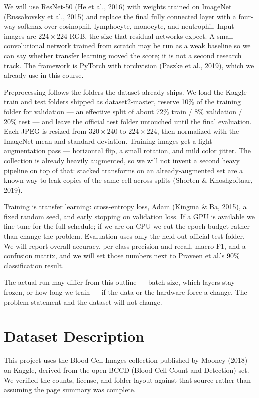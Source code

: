 \documentclass[11pt]{article}
\begin{document}
We will use ResNet-50 (He et al., 2016) with weights trained on ImageNet (Russakovsky et al., 2015) and replace the final fully connected layer with a four-way softmax over eosinophil, lymphocyte, monocyte, and neutrophil. Input images are $224\times 224$ RGB, the size that residual networks expect. A small convolutional network trained from scratch may be run as a weak baseline so we can say whether transfer learning moved the score; it is not a second research track. The framework is PyTorch with torchvision (Paszke et al., 2019), which we already use in this course.

Preprocessing follows the folders the dataset already ships. We load the Kaggle train and test folders shipped as dataset2-master, reserve 10\% of the training folder for validation --- an effective split of about 72\% train / 8\% validation / 20\% test --- and leave the official test folder untouched until the final evaluation. Each JPEG is resized from $320\times 240$ to $224\times 224$, then normalized with the ImageNet mean and standard deviation. Training images get a light augmentation pass --- horizontal flip, a small rotation, and mild color jitter. The collection is already heavily augmented, so we will not invent a second heavy pipeline on top of that: stacked transforms on an already-augmented set are a known way to leak copies of the same cell across splits (Shorten \& Khoshgoftaar, 2019).

Training is transfer learning: cross-entropy loss, Adam (Kingma \& Ba, 2015), a fixed random seed, and early stopping on validation loss. If a GPU is available we fine-tune for the full schedule; if we are on CPU we cut the epoch budget rather than change the problem. Evaluation uses only the held-out official test folder. We will report overall accuracy, per-class precision and recall, macro-F1, and a confusion matrix, and we will set those numbers next to Praveen et al.'s 90\% classification result.

The actual run may differ from this outline --- batch size, which layers stay frozen, or how long we train --- if the data or the hardware force a change. The problem statement and the dataset will not change.

\section{Dataset Description}

This project uses the Blood Cell Images collection published by Mooney (2018) on Kaggle, derived from the open BCCD (Blood Cell Count and Detection) set. We verified the counts, license, and folder layout against that source rather than assuming the page summary was complete.
\end{document}
